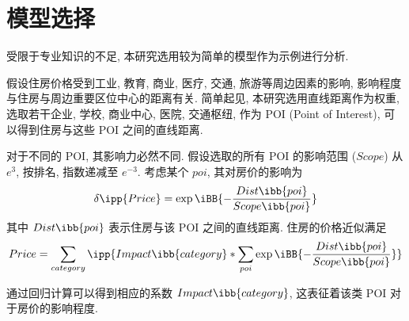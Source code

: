 \section{模型选择}
受限于专业知识的不足, 本研究选用较为简单的模型作为示例进行分析.

假设住房价格受到工业, 教育, 商业, 医疗, 交通, 旅游等周边因素的影响, 影响程度与住房与周边重要区位中心的距离有关.
简单起见, 本研究选用直线距离作为权重, 选取若干企业, 学校, 商业中心, 医院, 交通枢纽, 作为 POI (Point of Interest), 可以得到住房与这些 POI 之间的直线距离.

对于不同的 POI, 其影响力必然不同.
假设选取的所有 POI 的影响范围 ($Scope$) 从 $e^3$, 按排名, 指数递减至 $e^{-3}$.
考虑某个 $poi$, 其对房价的影响为
\begin{equation*}
    \delta\ipp{Price} = \exp\iBB{-\frac{Dist\ibb{poi}}{Scope\ibb{poi}}}
\end{equation*}
其中 $Dist\ibb{poi}$ 表示住房与该 POI 之间的直线距离.
住房的价格近似满足
\begin{equation*}
    Price
    = \sum_{category} \ipp{Impact\ibb{category} * \sum_{poi} \exp\iBB{-\frac{Dist\ibb{poi}}{Scope\ibb{poi}}}}
\end{equation*}

通过回归计算可以得到相应的系数 $Impact\ibb{category}$, 这表征着该类 POI 对于房价的影响程度.
